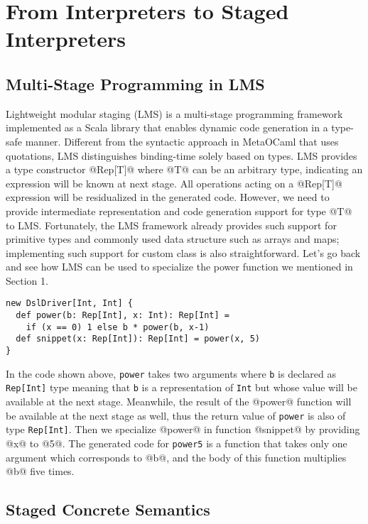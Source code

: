 \section{From Interpreters to Staged Interpreters} \label{stagedinterp}

\subsection{Multi-Stage Programming in LMS}

Lightweight modular staging (LMS) \cite{DBLP:conf/gpce/RompfO10} is a
multi-stage programming framework implemented as a Scala library that enables
dynamic code generation in a type-safe manner. Different from the syntactic
approach in MetaOCaml \cite{DBLP:conf/flops/Kiselyov14} that uses quotations,
LMS distinguishes binding-time solely based on types. LMS provides a type
constructor @Rep[T]@ where @T@ can be an arbitrary type, indicating an
expression will be known at next stage. All operations acting on a @Rep[T]@
expression will be residualized in the generated code. However, we need to
provide intermediate representation and code generation support for type @T@ to
LMS. Fortunately, the LMS framework already provides such support for primitive
types and commonly used data structure such as arrays and maps; implementing
such support for custom class is also straightforward. Let's go back and see how
LMS can be used to specialize the power function we mentioned in Section 1.

\begin{lstlisting}
new DslDriver[Int, Int] {
  def power(b: Rep[Int], x: Int): Rep[Int] =
    if (x == 0) 1 else b * power(b, x-1)
  def snippet(x: Rep[Int]): Rep[Int] = power(x, 5)
}
\end{lstlisting}

In the code shown above, \texttt{power} takes two arguments where \texttt{b} is
declared as \texttt{Rep[Int]} type meaning that \texttt{b} is a representation
of \texttt{Int} but whose value will be available at the next stage. Meanwhile,
the result of the @power@ function will be available at the next stage as well,
thus the return value of \texttt{power} is also of type \texttt{Rep[Int]}. Then
we specialize @power@ in function @snippet@ by providing @x@ to @5@. The
generated code for \texttt{power5} is a function that takes only one argument
which corresponds to @b@, and the body of this function multiplies @b@ five
times.

\subsection{Staged Concrete Semantics}

